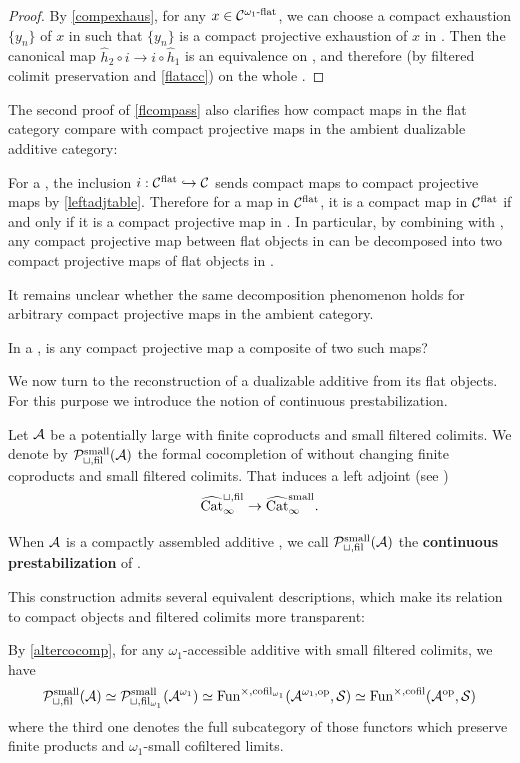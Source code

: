 \documentclass[a4paper,10pt, oneside]{amsart}
\begin{document}
	\begin{proof}
		By \cref{compexhaus}, for any $x\in\mathcal{C}^{\omega_1\text{-}\mathrm{flat}}$, we can choose a compact exhaustion $\{y_n\}$ of $x$ in \cflat such that $\{y_n\}$ is a compact projective exhaustion of $x$ in \mcc. Then
		the canonical map $\hat{h}_{2} \circ i \rightarrow i \circ \hat{h}_{1}$ is an equivalence on \cflatw, and therefore (by filtered colimit preservation and \cref{flatacc}) on the whole \cflat.
	\end{proof}
	The second proof of \cref{flcompass} also clarifies how compact maps in the flat category compare with compact projective maps in the ambient dualizable additive category:
	\begin{rem}\label{cprojmapfldecomp}
		For a \dualaddinfcat \mcc, the inclusion $i:\mathcal{C}^{\mathrm{flat}}\hookrightarrow \mathcal{C}$ sends compact maps to compact projective maps by \cref{leftadjtable}. Therefore for a map in $\mathcal{C}^{\mathrm{flat}}$, it is a compact map in $\mathcal{C}^{\mathrm{flat}}$ if and only if it is a compact projective map in \mcc. In particular, by combining with \cite[Remark 2.56]{ramzi2024dualizable}, any compact projective map between flat objects in \mcc can be decomposed into two compact projective maps of flat objects in \mcc.
	\end{rem}
It remains unclear whether the same decomposition phenomenon holds for arbitrary compact projective maps in the ambient category.
	\begin{quest}
		In a \dualaddinfcat \mcc, is any compact projective map a composite of two such maps?
	\end{quest}
	We now turn to the reconstruction of a dualizable additive \infcat from its  flat objects. For this purpose we introduce the notion of continuous prestabilization.
	\begin{de}
		Let $\mathcal{A}$ be a potentially large \infcat with finite coproducts and small filtered colimits. We denote by $\mathcal{P}_{\sqcup,\mathrm{fil}}^{\mathrm{small}}(\mathcal{A})$ the formal cocompletion of \mca without changing finite coproducts and small filtered colimits. That induces a left adjoint (see \cite[.6]{htt}) $$\widehat{\mathrm{Cat}}_{\infty}^{\sqcup,\mathrm{fil}}\to \widehat{\mathrm{Cat}}_{\infty}^{\mathrm{small}}.$$ 
		
		When $\mathcal{A}$ is a compactly assembled additive \infcat, we call $\mathcal{P}_{\sqcup,\mathrm{fil}}^{\mathrm{small}}(\mathcal{A})$ the \textbf{continuous prestabilization} of \mca.
	\end{de}
	This construction admits several equivalent descriptions, which make its relation to compact objects and filtered colimits more transparent:
	\begin{rem}
		By \cref{altercocomp}, for any $\omega_1$-accessible additive \infcat \mca with small filtered colimits, we have $$\mathcal{P}_{\sqcup,\mathrm{fil}}^{\mathrm{small}}(\mathcal{A})\simeq \mathcal{P}_{\sqcup,\mathrm{fil}_{\omega_1}}^{\mathrm{small}}(\mathcal{A}^{\omega_1})\simeq \operatorname{Fun}^{\times,\mathrm{cofil}_{\omega_1}}(\mathcal{A}^{\omega_1,\mathrm{op}},\mathcal{S})\simeq \operatorname{Fun}^{\times,\mathrm{cofil}}(\mathcal{A}^{\mathrm{op}},\mathcal{S})$$ where the third one denotes the full subcategory of those functors which preserve finite products and $\omega_1$-small cofiltered limits.
	\end{rem}
\end{document}
